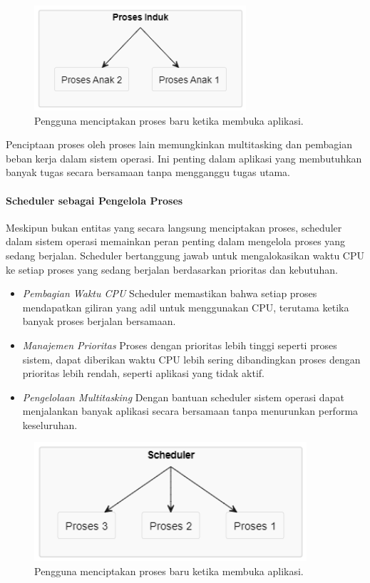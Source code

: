 \documentclass[12pt]{article}
\begin{document}
\begin{figure}[h]
    \centering
    \includegraphics[width=0.7\textwidth]{asset/parent child process creation.png}
    \caption{Pengguna menciptakan proses baru ketika membuka aplikasi.}
\end{figure}


Penciptaan proses oleh proses lain memungkinkan multitasking dan pembagian beban kerja dalam sistem operasi. Ini penting dalam aplikasi yang membutuhkan banyak tugas secara bersamaan tanpa mengganggu tugas utama.

\paragraph{Scheduler sebagai Pengelola Proses}
Meskipun bukan entitas yang secara langsung menciptakan proses, scheduler dalam sistem operasi memainkan peran penting dalam mengelola proses yang sedang berjalan. Scheduler bertanggung jawab untuk mengalokasikan waktu CPU ke setiap proses yang sedang berjalan berdasarkan prioritas dan kebutuhan.

\begin{itemize}
    \item \textit{Pembagian Waktu CPU} Scheduler memastikan bahwa setiap proses mendapatkan giliran yang adil untuk menggunakan CPU, terutama ketika banyak proses berjalan bersamaan.
    \item \textit{Manajemen Prioritas} Proses dengan prioritas lebih tinggi seperti proses sistem, dapat diberikan waktu CPU lebih sering dibandingkan proses dengan prioritas lebih rendah, seperti aplikasi yang tidak aktif.
    \item \textit{Pengelolaan Multitasking} Dengan bantuan scheduler sistem operasi dapat menjalankan banyak aplikasi secara bersamaan tanpa menurunkan performa keseluruhan.
\end{itemize}

\begin{figure}[h]
    \centering
    \includegraphics[width=0.9\textwidth]{asset/scheduler cpu allocation.png}
    \caption{Pengguna menciptakan proses baru ketika membuka aplikasi.}
\end{figure}
\end{document}
